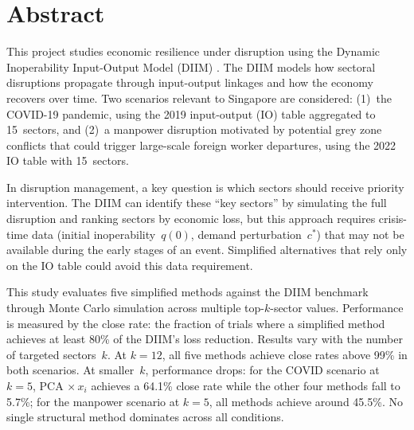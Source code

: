 \chapter*{Abstract}

This project studies economic resilience under disruption using the Dynamic Inoperability Input-Output Model (DIIM) \cite{SantosHaimes2004,JinZhou2023}. The DIIM models how sectoral disruptions propagate through input-output linkages and how the economy recovers over time. Two scenarios relevant to Singapore are considered: (1)~the COVID-19 pandemic, using the 2019 input-output (IO) table aggregated to 15~sectors, and (2)~a manpower disruption motivated by potential grey zone conflicts that could trigger large-scale foreign worker departures, using the 2022 IO table with 15~sectors.

In disruption management, a key question is which sectors should receive priority intervention. The DIIM can identify these ``key sectors'' by simulating the full disruption and ranking sectors by economic loss, but this approach requires crisis-time data (initial inoperability~$q(0)$, demand perturbation~$c^{*}$) that may not be available during the early stages of an event. Simplified alternatives that rely only on the IO table could avoid this data requirement.

This study evaluates five simplified methods against the DIIM benchmark through Monte Carlo simulation across multiple top-$k$-sector values. Performance is measured by the close rate: the fraction of trials where a simplified method achieves at least 80\% of the DIIM's loss reduction. Results vary with the number of targeted sectors~$k$. At $k = 12$, all five methods achieve close rates above 99\% in both scenarios. At smaller~$k$, performance drops: for the COVID scenario at $k = 5$, PCA $\times\, x_i$ achieves a 64.1\% close rate while the other four methods fall to 5.7\%; for the manpower scenario at $k = 5$, all methods achieve around 45.5\%. No single structural method dominates across all conditions.

\par
